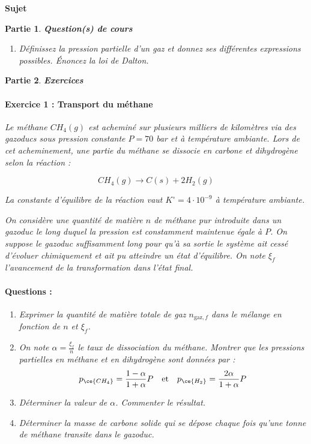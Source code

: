 \documentclass[a4paper,10pt,notitlepage,oneside]{article}
\theoremstyle{plain}
\newtheorem{partie}{\color{BlueViolet} Partie}
\begin{document}
\newpage



\begin{center}
    {\color{BlueViolet} \Large \textbf{\color{BlueViolet}Sujet }}
\end{center}
\setcounter{partie}{0}
\begin{partie} \textbf{\color{BlueViolet} Question(s) de cours}
\begin{enumerate}
    \item Définissez la pression partielle d’un gaz et donnez ses différentes expressions possibles. Énoncez la loi de Dalton.
\end{enumerate}
\end{partie}


\begin{partie} \textbf{\color{BlueViolet} Exercices}
\paragraph{\color{BlueViolet} Exercice 1 : Transport du méthane}
Le méthane $CH_4(g)$ est acheminé sur plusieurs milliers de kilomètres via des gazoducs sous pression constante $P = 70$ bar et à température ambiante. Lors de cet acheminement, une partie du méthane se dissocie en carbone et dihydrogène selon la réaction :

\begin{equation*}
CH_4(g) \rightarrow C(s) + 2 H_2(g)
\end{equation*}

La constante d’équilibre de la réaction vaut $K^\circ = 4 \cdot 10^{-9}$ à température ambiante.

On considère une quantité de matière $n$ de méthane pur introduite dans un gazoduc le long duquel la pression est constamment maintenue égale à $P$. On suppose le gazoduc suffisamment long pour qu’à sa sortie le système ait cessé d’évoluer chimiquement et ait pu atteindre un état d’équilibre. On note $\xi_f$ l’avancement de la transformation dans l’état final.

\paragraph{\color{BlueViolet} Questions :}
\begin{enumerate}
    \item Exprimer la quantité de matière totale de gaz $n_{\text{gaz},f}$ dans le mélange en fonction de $n$ et $\xi_f$.
    \item On note $\alpha = \frac{\xi_f}{n}$ le taux de dissociation du méthane. Montrer que les pressions partielles en méthane et en dihydrogène sont données par :
    \[
    p_{\ce{CH_4}} = \frac{1 - \alpha}{1 + \alpha} P \quad \text{et} \quad p_{\ce{H_2}} = \frac{2\alpha}{1 + \alpha} P
    \]
    \item Déterminer la valeur de $\alpha$. Commenter le résultat.
    \item Déterminer la masse de carbone solide qui se dépose chaque fois qu’une tonne de méthane transite dans le gazoduc.
\end{enumerate}


\end{partie}
\end{document}
